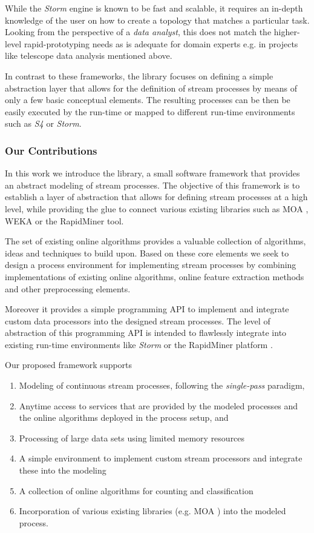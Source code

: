 While the {\em Storm} engine is known to be fast and scalable, it
requires an in-depth knowledge of the user on how to create a topology
that matches a particular task. Looking from the perspective of a {\em
  data analyst}, this does not match the higher-level
rapid-prototyping needs as is adequate for domain experts e.g. in
projects like telescope data analysis mentioned above.



In contrast to these frameworks, the \streams library focuses on
defining a simple abstraction layer that allows for the definition of
stream processes by means of only a few basic conceptual elements.
The resulting processes can be then be easily executed by the \streams
run-time or mapped to different run-time environments such as {\em S4}
or {\em Storm}.

\subsubsection*{Our Contributions}
In this work we introduce the \streams library, a small software
framework that provides an abstract modeling of stream processes. The
objective of this framework is to establish a layer of abstraction
that allows for defining stream processes at a high level, while
providing the glue to connect various existing libraries such as MOA
\cite{moa}, WEKA \cite{weka} or the RapidMiner tool.

The set of existing online algorithms provides a valuable collection
of algorithms, ideas and techniques to build upon. Based on these core
elements we seek to design a process environment for implementing
stream processes by combining implementations of existing online
algorithms, online feature extraction methods and other preprocessing
elements.

Moreover it provides a simple programming API to implement and
integrate custom data processors into the designed stream processes.
The level of abstraction of this programming API is intended to
flawlessly integrate into existing run-time environments like {\em
  Storm} or the RapidMiner platform \cite{rapidminerStreams}.

Our proposed framework supports
\begin{enumerate}
\item Modeling of continuous stream processes, following the {\em
    single-pass} paradigm,
\item Anytime access to services that are provided by the modeled
  processes and the online algorithms deployed in the process setup,
  and
\item Processing of large data sets using limited memory resources
\item A simple environment to implement custom stream processors and
  integrate these into the modeling
\item A collection of online algorithms for counting and classification
\item Incorporation of various existing libraries (e.g. MOA
  \cite{moa}) into the modeled process.
\end{enumerate}

